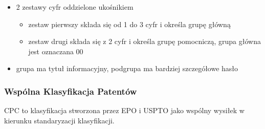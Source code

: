 \begin{enumerate}
    \begin{itemize}
        \item 2 zestawy cyfr oddzielone ukośnikiem
        \begin{itemize}
            \item zestaw pierwszy składa się od 1 do 3 cyfr i określa grupę główną
            \item zestaw drugi składa się z 2 cyfr i określa grupę pomocniczą, grupa główna jest oznaczana 00
        \end{itemize}
        \item grupa ma tytuł informacyjny, podgrupa ma bardziej szczegółowe hasło
    \end{itemize}
\end{enumerate}



\subsubsection{Wspólna Klasyfikacja Patentów}

\ac{CPC} to klasyfikacja stworzona przez \ac{EPO} i \ac{USPTO}
jako wspólny wysiłek w kierunku standaryzacji klasyfikacji.

